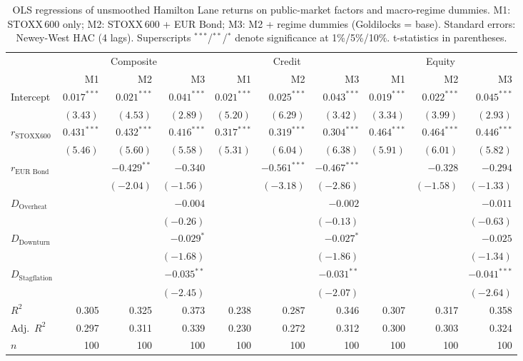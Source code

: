 \begin{table}[htbp]
\centering
\footnotesize
\caption{OLS regressions of unsmoothed Hamilton Lane returns on public-market factors and macro-regime dummies. M1: STOXX\,600 only; M2: STOXX\,600 + EUR Bond; M3: M2 + regime dummies (Goldilocks = base). Standard errors: Newey-West HAC (4 lags). Superscripts $^{***}$/$^{**}$/$^{*}$ denote significance at 1\%/5\%/10\%. t-statistics in parentheses.}
\label{tab:pm_factor_regression}
\begin{tabular}{lrrrrrrrrr}
\toprule
 & \multicolumn{3}{c|}{Composite} & \multicolumn{3}{c|}{Credit} & \multicolumn{3}{c}{Equity} \\
 & M1 & M2 & M3 & M1 & M2 & M3 & M1 & M2 & M3 \\
\midrule
Intercept & $0.017^{***}$ & $0.021^{***}$ & $0.041^{***}$ & $0.021^{***}$ & $0.025^{***}$ & $0.043^{***}$ & $0.019^{***}$ & $0.022^{***}$ & $0.045^{***}$ \\
 & $(3.43)$ & $(4.53)$ & $(2.89)$ & $(5.20)$ & $(6.29)$ & $(3.42)$ & $(3.34)$ & $(3.99)$ & $(2.93)$ \\[2pt]
$r_{\text{STOXX}600}$ & $0.431^{***}$ & $0.432^{***}$ & $0.416^{***}$ & $0.317^{***}$ & $0.319^{***}$ & $0.304^{***}$ & $0.464^{***}$ & $0.464^{***}$ & $0.446^{***}$ \\
 & $(5.46)$ & $(5.60)$ & $(5.58)$ & $(5.31)$ & $(6.04)$ & $(6.38)$ & $(5.91)$ & $(6.01)$ & $(5.82)$ \\[2pt]
$r_{\text{EUR Bond}}$ &  & $-0.429^{**}$ & $-0.340$ &  & $-0.561^{***}$ & $-0.467^{***}$ &  & $-0.328$ & $-0.294$ \\
 &  & $(-2.04)$ & $(-1.56)$ &  & $(-3.18)$ & $(-2.86)$ &  & $(-1.58)$ & $(-1.33)$ \\[2pt]
$D_{\text{Overheat}}$ &  &  & $-0.004$ &  &  & $-0.002$ &  &  & $-0.011$ \\
 &  &  & $(-0.26)$ &  &  & $(-0.13)$ &  &  & $(-0.63)$ \\[2pt]
$D_{\text{Downturn}}$ &  &  & $-0.029^{*}$ &  &  & $-0.027^{*}$ &  &  & $-0.025$ \\
 &  &  & $(-1.68)$ &  &  & $(-1.86)$ &  &  & $(-1.34)$ \\[2pt]
$D_{\text{Stagflation}}$ &  &  & $-0.035^{**}$ &  &  & $-0.031^{**}$ &  &  & $-0.041^{***}$ \\
 &  &  & $(-2.45)$ &  &  & $(-2.07)$ &  &  & $(-2.64)$ \\[2pt]
\midrule
$R^2$ & 0.305 & 0.325 & 0.373 & 0.238 & 0.287 & 0.346 & 0.307 & 0.317 & 0.358 \\
Adj.\ $R^2$ & 0.297 & 0.311 & 0.339 & 0.230 & 0.272 & 0.312 & 0.300 & 0.303 & 0.324 \\
$n$ & 100 & 100 & 100 & 100 & 100 & 100 & 100 & 100 & 100 \\
\bottomrule
\end{tabular}
\end{table}

